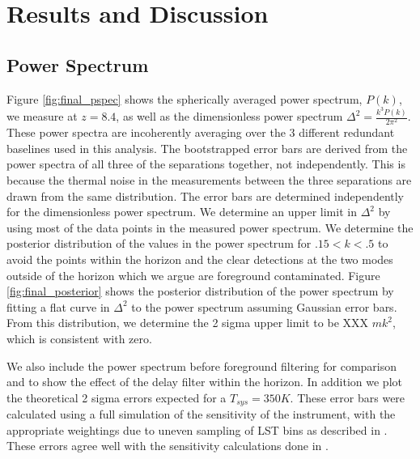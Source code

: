 \documentclass[twocolumn,numberedappendix]{emulateapj} \shorttitle{PSA64}
\begin{document}
\section{Results and Discussion}\label{sec:results}
\subsection{Power Spectrum}
Figure \ref{fig:final_pspec} shows the spherically averaged power spectrum,
$P(k)$, we measure at $z=8.4$, as well as the dimensionless power spectrum
$\Delta^{2} = \frac{k^{3}P(k)}{2\pi^{2}}$. These power spectra are incoherently
averaging over the 3 different redundant baselines used in this analysis. The
bootstrapped error bars are derived from the power spectra of all three of the
separations together, not independently. This is because the thermal noise in
the measurements between the three separations are drawn from the same
distribution. The error bars are determined independently for the dimensionless
power spectrum. We determine an upper limit in $\Delta^{2}$ by using most of the
data points in the measured power spectrum. We determine the posterior
distribution of the values in the power spectrum for $.15<k<.5$ to avoid the
points within the horizon and the clear detections at the two modes outside of
the horizon which we argue are foreground contaminated. Figure
\ref{fig:final_posterior} shows the posterior distribution of the power spectrum
by fitting a flat curve in $\Delta^{2}$ to the power spectrum assuming
Gaussian error bars. From this distribution, we determine the 2 sigma upper
limit to be XXX $mk^{2}$, which is consistent with zero.

We also include the power spectrum before foreground filtering for comparison
and to show the effect of the delay filter within the horizon. In addition we
plot the theoretical 2 sigma errors expected for a $T_{sys} = 350 K$. These
error bars were calculated using a full simulation of the sensitivity of the
instrument, with the appropriate weightings due to uneven sampling of LST bins
as described in \cite{pober_et_al2014}. These errors agree well with the
sensitivity calculations done in \cite{parsons_et_al2012a}. 
\end{document}

